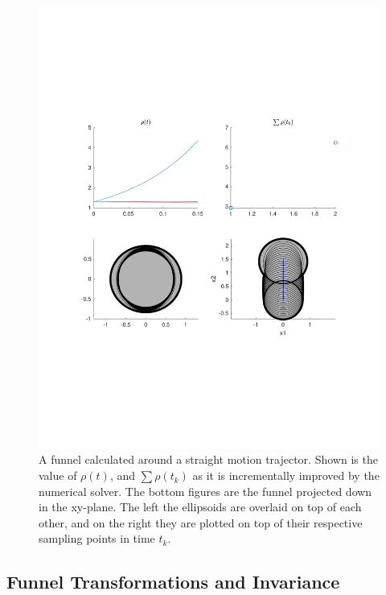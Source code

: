 \begin{figure}
  \centering \includegraphics[scale=.5, trim={0cm 6cm 0cm
    6cm}]{figures/method/funnel-calculation-visuals}
  \caption[A funnel calculated around a straight trajector]{A funnel calculated
    around a straight motion trajector. Shown is the value of \(\rho(t)\), and
    \(\sum \rho(t_k)\) as it is incrementally improved by the numerical solver.
    The bottom figures are the funnel projected down in the xy-plane. The left
    the ellipsoids are overlaid on top of each other, and on the right they are
    plotted on top of their respective sampling points in time \(t_k\).}
  \label{fig:funnel-calculation-visuals}
\end{figure}


\subsection{Funnel Transformations and Invariance}
\label{subsec:shifting-funnels}

